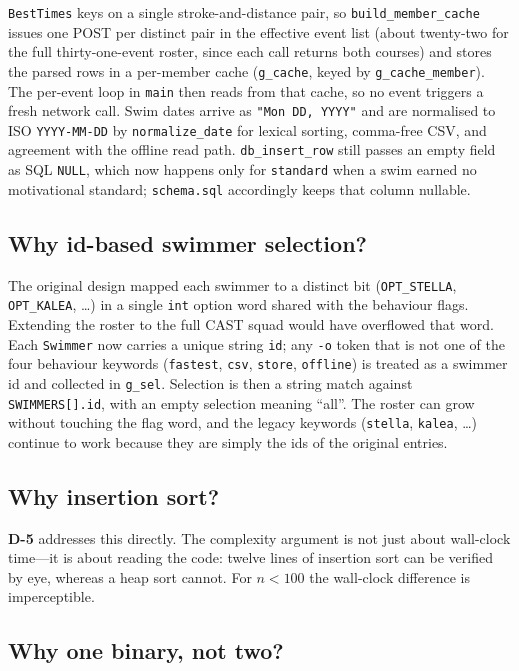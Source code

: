 \documentclass[12pt]{article}
\newcommand{\code}[1]{\texttt{#1}}
\newcommand{\req}[1]{\textbf{#1}}
\begin{document}
\code{BestTimes} keys on a single stroke-and-distance pair, so
\code{build\_member\_cache} issues one POST per distinct pair in the
effective event list (about twenty-two for the full thirty-one-event
roster, since each call returns both courses) and stores the parsed
rows in a per-member cache (\code{g\_cache}, keyed by
\code{g\_cache\_member}).  The per-event loop in \code{main} then reads
from that cache, so no event triggers a fresh network call.  Swim dates
arrive as \code{"Mon DD, YYYY"} and are normalised to ISO
\code{YYYY-MM-DD} by \code{normalize\_date} for lexical sorting,
comma-free CSV, and agreement with the offline read path.
\code{db\_insert\_row} still passes an empty field as SQL \code{NULL},
which now happens only for \code{standard} when a swim earned no
motivational standard; \code{schema.sql} accordingly keeps that column
nullable.

\subsection{Why id-based swimmer selection?}
\label{sec:why-ids}

The original design mapped each swimmer to a distinct bit
(\code{OPT\_STELLA}, \code{OPT\_KALEA}, \dots) in a single \code{int}
option word shared with the behaviour flags.  Extending the roster to
the full CAST squad would have overflowed that word.  Each
\code{Swimmer} now carries a unique string \code{id}; any \code{-o}
token that is not one of the four behaviour keywords (\code{fastest},
\code{csv}, \code{store}, \code{offline}) is treated as a swimmer id
and collected in \code{g\_sel}.  Selection is then a string match
against \code{SWIMMERS[].id}, with an empty selection meaning ``all''.
The roster can grow without touching the flag word, and the legacy
keywords (\code{stella}, \code{kalea}, \dots) continue to work because
they are simply the ids of the original entries.

\subsection{Why insertion sort?}

\req{D-5} addresses this directly.  The complexity argument is
not just about wall-clock time---it is about reading the code:
twelve lines of insertion sort can be verified by eye, whereas a
heap sort cannot.  For $n < 100$ the wall-clock difference is
imperceptible.

\subsection{Why one binary, not two?}
\end{document}
